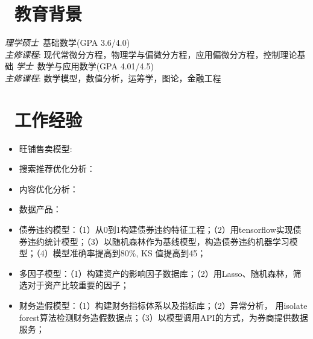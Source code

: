 \documentclass{resume}
\begin{document}


 
\section{\faGraduationCap\  教育背景}
\textit{理学硕士}\ 基础数学(GPA 3.6/4.0)\\
\textit{主修课程}:
现代常微分方程，物理学与偏微分方程，应用偏微分方程，控制理论基础
\textit{学士}\ 数学与应用数学(GPA 4.01/4.5)\\
\textit{主修课程}:
数学模型，数值分析，运筹学，图论，金融工程

\section{\faUsers\ 工作经验}
\role{资深数据分析师}{}
\begin{onehalfspacing}
  \begin{itemize}
    \item 旺铺售卖模型:
    \item 搜索推荐优化分析：
    \item 内容优化分析：
    \item 数据产品：
  \end{itemize}
\end{onehalfspacing}


\begin{onehalfspacing}
\begin{itemize}
  \item 债券违约模型：（1）从0到1构建债券违约特征工程；（2）用tensorflow实现债券违约统计模型；（3）以随机森林作为基线模型，构造债券违约机器学习模型；（4）模型准确率提高到80\%, KS 值提高到45；
  \item 多因子模型：（1）构建资产的影响因子数据库；（2）用Lasso、随机森林，筛选对于资产比较重要的因子；	 
  \item 财务造假模型：（1）构建财务指标体系以及指标库；（2）异常分析， 用isolate forest算法检测财务造假数据点；（3）以模型调用API的方式，为券商提供数据服务；
\end{itemize}
\end{onehalfspacing}
\end{document}
